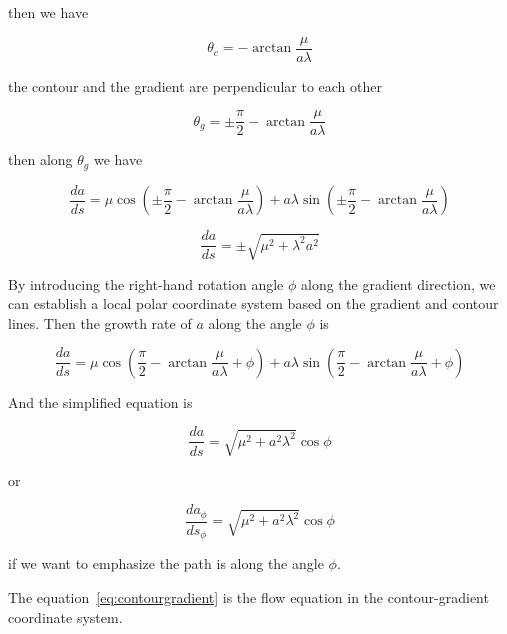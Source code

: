 then we have

\begin{equation}
    \theta_c = - \arctan \frac{\mu}{a \lambda}\label{eq:contourangle}
\end{equation}

the contour and the gradient are perpendicular to each other

\begin{equation}
    \theta_g = \pm \frac{\pi}{2} - \arctan \frac{\mu}{a \lambda}\label{eq:gradientangle}
\end{equation}

then along $\theta_g$ we have

\begin{equation}
    \frac{da}{ds} = \mu \cos (\pm \frac{\pi}{2} - \arctan \frac{\mu}{a \lambda}) + a \lambda \sin (\pm \frac{\pi}{2} - \arctan \frac{\mu}{a \lambda})
    \label{eq:alonggradient}
\end{equation}

\begin{equation}
    \frac{da}{ds} = \pm \sqrt{\mu^2 + \lambda^2 a^2}\label{eq:grad}
\end{equation}

By introducing the right-hand rotation angle $\phi$ along the gradient direction, we can establish a local polar coordinate system based on the gradient and contour lines.
Then the growth rate of $a$ along the angle $\phi$ is

\begin{equation}
    \frac{da}{ds} = \mu \cos (\frac{\pi}{2} - \arctan \frac{\mu}{a \lambda} + \phi) + a \lambda \sin (\frac{\pi}{2} - \arctan \frac{\mu}{a \lambda} + \phi)
    \label{eq:fourfold}
\end{equation}

And the simplified equation is

\begin{equation}
    \frac{da}{ds} = \sqrt {\mu^2 + a^2 \lambda^2} \cos \phi\label{eq:contourgradient}
\end{equation}

or

\begin{equation}
    \frac{da_{\phi}}{ds_{\phi}} = \sqrt {\mu^2 + a^2 \lambda^2} \cos \phi\label{eq:contourgradient2}
\end{equation}

if we want to emphasize the path is along the angle $\phi$.

The equation~\eqref{eq:contourgradient} is the flow equation in the contour-gradient coordinate system.

